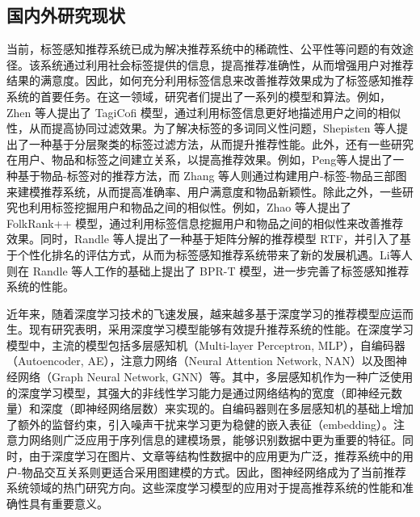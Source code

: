 \subsection{国内外研究现状}
当前，标签感知推荐系统已成为解决推荐系统中的稀疏性、公平性等问题的有效途径。该系统通过利用社会标签提供的信息，提高推荐准确性，从而增强用户对推荐结果的满意度。因此，如何充分利用标签信息来改善推荐效果成为了标签感知推荐系统的首要任务。在这一领域，研究者们提出了一系列的模型和算法。例如，Zhen 等人\cite{zhen_tagicofi_2009}提出了 TagiCofi 模型，通过利用标签信息更好地描述用户之间的相似性，从而提高协同过滤效果。为了解决标签的多词同义性问题，Shepisten 等人\citep{shepitsen_personalized_2008}提出了一种基于分层聚类的标签过滤方法，从而提升推荐性能。此外，还有一些研究在用户、物品和标签之间建立关系，以提高推荐效果。例如，Peng等人\cite{peng_collaborative_2010}提出了一种基于物品-标签对的推荐方法，而 Zhang 等人\cite{zhang_personalized_2010, zhang_solving_2012}则通过构建用户-标签-物品三部图来建模推荐系统，从而提高准确率、用户满意度和物品新颖性。除此之外，一些研究也利用标签挖掘用户和物品之间的相似性。例如，Zhao 等人\cite{zhao_folkrank_2021}提出了 FolkRank++ 模型，通过利用标签信息挖掘用户和物品之间的相似性来改善推荐效果。同时，Randle 等人\cite{rendle_learning_2009}提出了一种基于矩阵分解的推荐模型 RTF，并引入了基于个性化排名的评估方式，从而为标签感知推荐系统带来了新的发展机遇。Li等人\cite{li_tag-aware_2019}则在 Randle 等人工作的基础上提出了 BPR-T 模型，进一步完善了标签感知推荐系统的性能。

近年来，随着深度学习技术的飞速发展，越来越多基于深度学习的推荐模型应运而生。现有研究表明，采用深度学习模型能够有效提升推荐系统的性能。在深度学习模型中，主流的模型包括多层感知机（Multi-layer Perceptron, MLP）\cite{he_neural_2017,zhang_deep_2016,qu_product-based_2018,shan_deep_2016}，自编码器（Autoencoder, AE）\cite{sedhain_autorec_2015, liang_variational_2018}，注意力网络（Neural Attention Network, NAN）\cite{he_nais_2018, chen_attentive_2017}以及图神经网络（Graph Neural Network, GNN）\cite{wang_neural_2019,he_lightgcn_2020}等。其中，多层感知机作为一种广泛使用的深度学习模型，其强大的非线性学习能力是通过网络结构的宽度（即神经元数量）和深度（即神经网络层数）来实现的。自编码器则在多层感知机的基础上增加了额外的监督约束，引入噪声干扰来学习更为稳健的嵌入表征（embedding）。注意力网络则广泛应用于序列信息的建模场景，能够识别数据中更为重要的特征。同时，由于深度学习在图片、文章等结构性数据中的应用更为广泛，推荐系统中的用户-物品交互关系则更适合采用图建模的方式。因此，图神经网络成为了当前推荐系统领域的热门研究方向。这些深度学习模型的应用对于提高推荐系统的性能和准确性具有重要意义。

